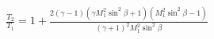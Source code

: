 \documentclass[10pt]{article}
\begin{document}
\begin{align*}\frac{T_{2}}{T_{1}}
=
1 +  
\frac{ 
2 \left( \gamma - 1 \right) 
\left( \gamma M_{1}^{2} \sin^2 \beta + 1 \right)
\left( M_{1}^{2} \sin^2 \beta - 1 \right)
}
{
\left( \gamma + 1 \right)^2 M_{1}^{2} \sin^2 \beta
}

\end{align*}
\end{document}
